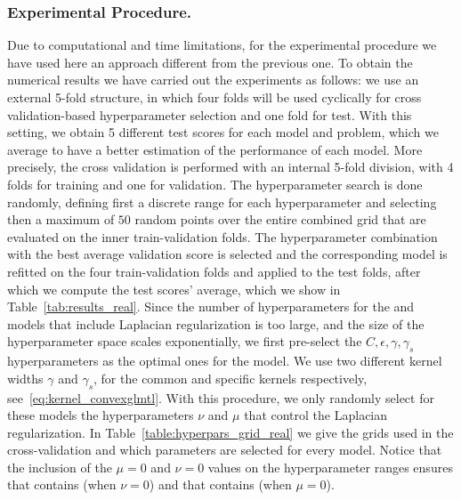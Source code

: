 \subsubsection*{Experimental Procedure.}
Due to computational and time limitations, for the experimental procedure we have used here an approach  different from the previous one.
To obtain the numerical results we have carried out the experiments as follows: we use an external 5-fold structure, in which four folds will be used cyclically for cross validation-based hyperparameter selection and one fold for test. 
With this setting, we obtain 5 different test scores for each model and problem, which we average to have a better estimation of the performance of each model.
More precisely, the cross validation is performed %
with an internal 5-fold division, with 4 folds for training and one for validation.
The hyperparameter search is done randomly, defining first a discrete range for each hyperparameter and selecting then a maximum of $50$ random points over the entire combined grid that are evaluated on the inner train-validation folds.
The hyperparameter combination with the best average validation score is selected and the corresponding model is refitted on the four train-validation folds and applied to the test folds, after which we compute the test scores' average, which we show in Table~\ref{tab:results_real}.
Since the number of hyperparameters for the  and  models that include Laplacian regularization is too large, and the size of the hyperparameter space scales exponentially, we first pre-select the $C, \epsilon, \gamma, \gamma_s$ hyperparameters as the optimal ones for the  model.
We use two different kernel widths $\gamma$ and $\gamma_s$, for the common and specific kernels respectively, see~\eqref{eq:kernel_convexglmtl}.
With this procedure, we only randomly select for these models the hyperparameters $\nu$ and $\mu$ that control the Laplacian regularization.
In Table~\ref{table:hyperpars_grid_real} we give the grids used in the cross-validation and which parameters are selected for every model.
Notice that the inclusion of the $\mu = 0$ and $\nu = 0$ values on the hyperparameter ranges ensures that  contains  (when $\nu = 0$) and that  contains  (when $\mu = 0$).


